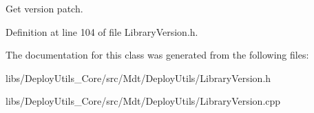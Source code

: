 Get version patch. 



Definition at line 104 of file Library\+Version.\+h.



The documentation for this class was generated from the following files\+:\begin{DoxyCompactItemize}
\item 
libs/\+Deploy\+Utils\+\_\+\+Core/src/\+Mdt/\+Deploy\+Utils/Library\+Version.\+h\item 
libs/\+Deploy\+Utils\+\_\+\+Core/src/\+Mdt/\+Deploy\+Utils/Library\+Version.\+cpp\end{DoxyCompactItemize}
